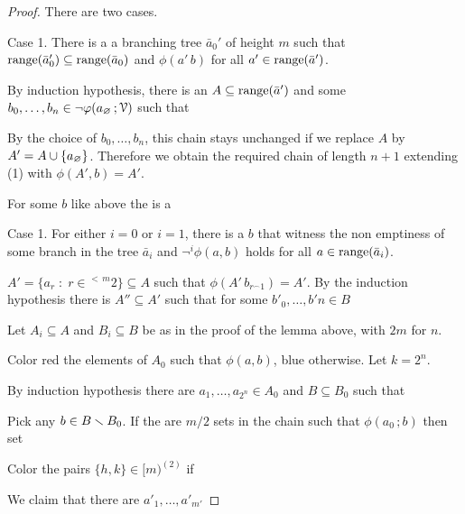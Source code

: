 \documentclass[scombinatorics.tex]{subfiles}
\begin{document}
\begin{proof}
  
  There are two cases.

  Case 1. There is a a branching tree $\bar a_0'$ of height $m$ such that $\mathop{\rm range}(\bar a'_0)\subseteq\mathop{\rm range}(\bar a_0)$ and $\phi(a'\,b)$ for all $a'\in\mathop{\rm range}(\bar a')$.

  By induction hypothesis, there is an $A\subseteq\mathop{\rm range}(\bar a')$ and some $b_0,\dots,b_n\in\neg\varphi(a_\varnothing\,;\EuScript V)$ such that 


  By the choice of $b_0,\dots,b_n$, this chain stays unchanged if we replace $A$ by $A'=A\cup\{a_\varnothing\}$.
  Therefore we obtain the required chain of length $n+1$ extending (1) with $\phi(A',b)=A'$.
  

  For some $b$ like above the is a 

  Case 1.
  For either $i=0$ or $i=1$, there is a $b$ that witness the non emptiness of some branch in the tree $\bar a_i$ and $\neg^i\phi(a,b)$ holds for all $a\in\mathop{\rm range}(\bar a_i)$.  
  
  $A'=\{a_{r}\;:\;r\in {}^{<\,m}2\}\subseteq A$ such that $\phi(A'\,b_{r^\frown1})=A'$.
  By the induction hypothesis there is $A''\subseteq A'$ such that for some $b'_0,\dots,b'n\in B$




  Let $A_i\subseteq A$ and $B_i\subseteq B$ be as in the proof of the lemma above, with $2m$ for $n$.


  Color red the elements of $A_0$ such that $\phi(a,b)$, blue otherwise.
  Let $k=2^n$.

  By induction hypothesis there are $a_1,\dots,a_{2^n}\in A_0$ and $B\subseteq B_0$ such that


  Pick any $b\in B\smallsetminus B_0$.
  If the are $m/2$ sets in the chain such that $\phi(a_0\,;b)$ then set 




  Color the pairs $\{h,k\}\in [m)^{(2)}$ if

  We claim that there are $a'_1,\dots,a'_{m'}$ 




\end{proof}
\end{document}
